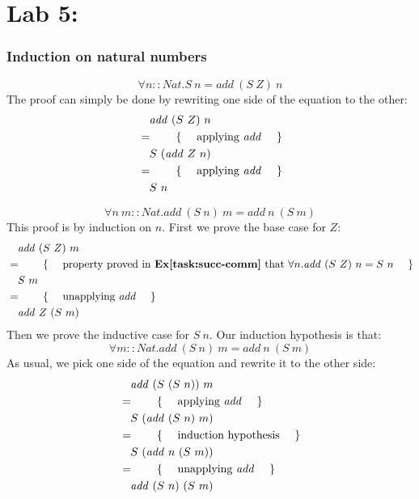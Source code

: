\pagebreak \section{Lab 5: \practicalFiveTitle}

\subsubsection{Induction on natural numbers}

\begin{displaymath}
\forall n :: \mathit{Nat} . S~n = \mathit{add}~(S~Z)~n
\end{displaymath}
The proof can simply be done by rewriting one side of the equation to the other:
\begin{align*}
&\quad \mathit{add}~(S~Z)~n\\
&=\qquad\text{\{\quad\ applying $\mathit{add}$ \quad\}}\\
&\quad S~(\mathit{add}~Z~n)\\
&=\qquad\text{\{\quad\ applying $\mathit{add}$ \quad\}}\\
&\quad S~n
\end{align*}

\begin{displaymath}
\forall n~m :: \mathit{Nat} . \mathit{add}~(S~n)~m = \mathit{add}~n~(S~m)
\end{displaymath}
This proof is by induction on $n$. First we prove the base case for $Z$:
\begin{align*}
&\quad \mathit{add}~(S~Z)~m\\
&=\qquad\text{\{\quad\ property proved in \textbf{Ex\ref{task:succ-comm}} that $\forall n.\mathit{add}~(S~Z)~n=S~n$ \quad\}}\\
&\quad S~m\\
&=\qquad\text{\{\quad\ unapplying $\mathit{add}$ \quad\}}\\
&\quad \mathit{add}~Z~(S~m)
\end{align*}
Then we prove the inductive case for $S~n$. Our induction hypothesis is that:
\begin{displaymath}
\forall m :: \mathit{Nat} . \mathit{add}~(S~n)~m = \mathit{add}~n~(S~m)
\end{displaymath}
As usual, we pick one side of the equation and rewrite it to the other side:
\begin{align*}
&\quad \mathit{add}~(S~(S~n))~m\\
&=\qquad\text{\{\quad\ applying $\mathit{add}$ \quad\}}\\
&\quad S~(\mathit{add}~(S~n)~m)\\
&=\qquad\text{\{\quad\ induction hypothesis \quad\}}\\
&\quad S~(\mathit{add}~n~(S~m))\\
&=\qquad\text{\{\quad\ unapplying $\mathit{add}$ \quad\}}\\
&\quad \mathit{add}~(S~n)~(S~m)
\end{align*}

